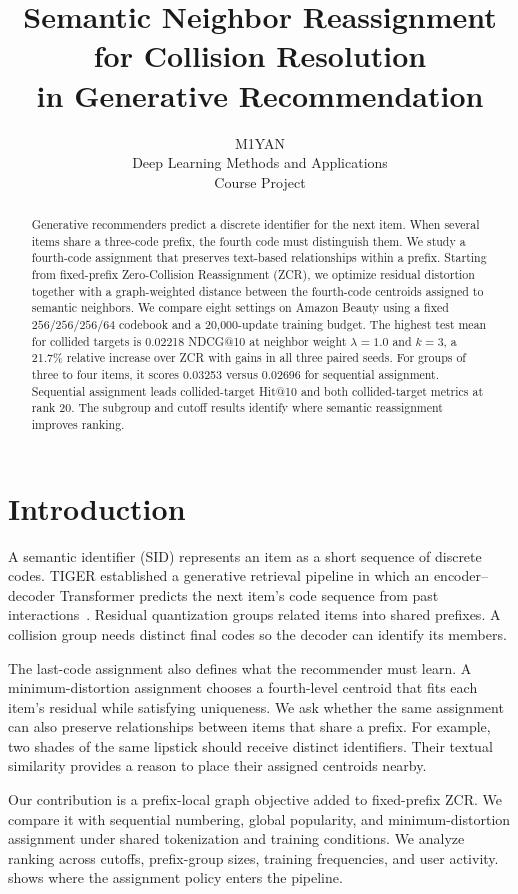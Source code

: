 \documentclass[10pt,twocolumn,letterpaper]{article}
\title{Semantic Neighbor Reassignment for Collision Resolution\texorpdfstring{\\}{ }in Generative Recommendation}
\author{M1YAN\\
Deep Learning Methods and Applications\\
Course Project}
\newcommand{\codebooks}{\ensuremath{256/256/256/64}}
\begin{document}
\maketitle

\begin{abstract}
Generative recommenders predict a discrete identifier for the next item.
When several items share a three-code prefix, the fourth code must distinguish them.
We study a fourth-code assignment that preserves text-based relationships within a prefix.
Starting from fixed-prefix Zero-Collision Reassignment (ZCR), we optimize residual distortion together with a graph-weighted distance between the fourth-code centroids assigned to semantic neighbors.
We compare eight settings on Amazon Beauty using a fixed \codebooks{} codebook and a 20,000-update training budget.
The highest test mean for collided targets is 0.02218 NDCG@10 at neighbor weight $\lambda=1.0$ and $k=3$, a 21.7\% relative increase over ZCR with gains in all three paired seeds.
For groups of three to four items, it scores 0.03253 versus 0.02696 for sequential assignment.
Sequential assignment leads collided-target Hit@10 and both collided-target metrics at rank 20.
The subgroup and cutoff results identify where semantic reassignment improves ranking.
\end{abstract}

\section{Introduction}
\label{sec:intro}
A semantic identifier (SID) represents an item as a short sequence of discrete codes.
TIGER established a generative retrieval pipeline in which an encoder--decoder Transformer predicts the next item's code sequence from past interactions~\cite{rajput2023generative}.
Residual quantization groups related items into shared prefixes.
A collision group needs distinct final codes so the decoder can identify its members.

The last-code assignment also defines what the recommender must learn.
A minimum-distortion assignment chooses a fourth-level centroid that fits each item's residual while satisfying uniqueness.
We ask whether the same assignment can also preserve relationships between items that share a prefix.
For example, two shades of the same lipstick should receive distinct identifiers.
Their textual similarity provides a reason to place their assigned centroids nearby.

Our contribution is a prefix-local graph objective added to fixed-prefix ZCR.
We compare it with sequential numbering, global popularity, and minimum-distortion assignment under shared tokenization and training conditions.
We analyze ranking across cutoffs, prefix-group sizes, training frequencies, and user activity.
 shows where the assignment policy enters the pipeline.
\end{document}

